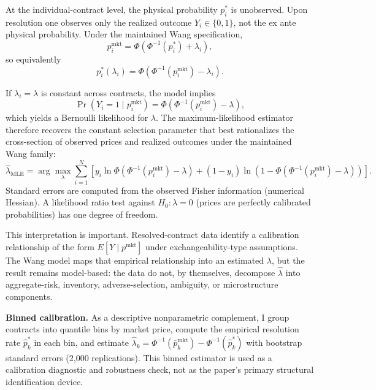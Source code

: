 \documentclass[12pt,a4paper]{article}
\begin{document}
At the individual-contract level, the physical probability $p_i^*$ is unobserved. Upon resolution one observes only the realized outcome $Y_i \in \{0,1\}$, not the ex ante physical probability. Under the maintained Wang specification,
\[
p_i^{\mathrm{mkt}}=\Phi\!\left(\Phi^{-1}(p_i^*)+\lambda_i\right),
\]
so equivalently
\[
p_i^*(\lambda_i)=\Phi\!\left(\Phi^{-1}(p_i^{\mathrm{mkt}})-\lambda_i\right).
\]

If $\lambda_i=\lambda$ is constant across contracts, the model implies
\[
\Pr(Y_i=1\mid p_i^{\mathrm{mkt}})=\Phi\!\left(\Phi^{-1}(p_i^{\mathrm{mkt}})-\lambda\right),
\]
which yields a Bernoulli likelihood for $\lambda$. The maximum-likelihood estimator therefore recovers the constant selection parameter that best rationalizes the cross-section of observed prices and realized outcomes under the maintained Wang family:
\[
\hat\lambda_{\mathrm{MLE}}
=
\arg\max_\lambda
\sum_{i=1}^N
\left[
y_i\ln \Phi\!\left(\Phi^{-1}(p_i^{\mathrm{mkt}})-\lambda\right)
+
(1-y_i)\ln\!\left(1-\Phi\!\left(\Phi^{-1}(p_i^{\mathrm{mkt}})-\lambda\right)\right)
\right].
\]
Standard errors are computed from the observed Fisher information (numerical Hessian). A likelihood ratio test against $H_0:\lambda=0$ (prices are perfectly calibrated probabilities) has one degree of freedom.

This interpretation is important. Resolved-contract data identify a calibration relationship of the form $E[Y\mid p^{\mathrm{mkt}}]$ under exchangeability-type assumptions. The Wang model maps that empirical relationship into an estimated $\lambda$, but the result remains model-based: the data do not, by themselves, decompose $\hat\lambda$ into aggregate-risk, inventory, adverse-selection, ambiguity, or microstructure components.

\textbf{Binned calibration.} As a descriptive nonparametric complement, I group contracts into quantile bins by market price, compute the empirical resolution rate $\hat p_k^*$ in each bin, and estimate $\hat\lambda_k = \Phi^{-1}(\bar p_k^{\mathrm{mkt}}) - \Phi^{-1}(\hat p_k^*)$ with bootstrap standard errors (2,000 replications). This binned estimator is used as a calibration diagnostic and robustness check, not as the paper's primary structural identification device.
\end{document}

